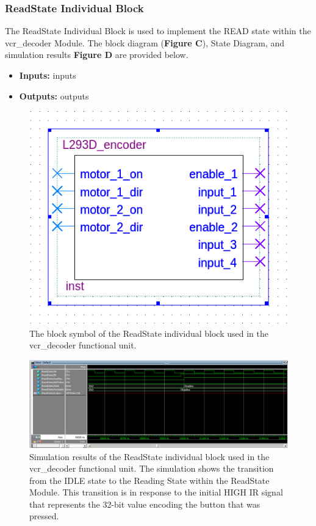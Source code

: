\documentclass[a4paper]{article}
\begin{document}
\subsubsection{ReadState Individual Block}
The ReadState Individual Block is used to implement the READ state within the vcr\_decoder Module. The block diagram (\textbf{Figure C}), State Diagram, and simulation results \textbf{Figure D} are provided below.
\begin{itemize}
  \item \textbf{Inputs:  } inputs
  \item \textbf{Outputs: } outputs
\end{itemize}
\begin{figure}[h]
  \centering
  \includegraphics[width=.48\textwidth]{symbols/individual_placeholder.png}
  \caption{The block symbol of the ReadState individual block used in the vcr\_decoder functional unit.}
    \label{fig:individual-1-2-block}
\end{figure}
\begin{figure}[h]
  \centering
  \includegraphics[width=.98\textwidth]{sims/vcr_testing/moduleTests/ReadState/IDLE_to_READING_Transition.png}
  \caption{Simulation results of the ReadState individual block used in the vcr\_decoder functional unit. The simulation shows the transition from the IDLE state to the Reading State within the ReadState Module. This transition is in response to the initial HIGH IR signal that represents the 32-bit value encoding the button that was pressed.}
    \label{fig:individual-1-2-sim}
\end{figure}
\end{document}
